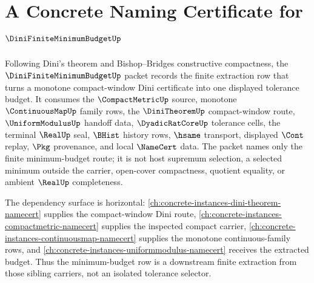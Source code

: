 \chapter{A Concrete Naming Certificate for $\DiniFiniteMinimumBudgetUp$}
\label{ch:concrete-instances-dini-finite-minimum-budget-namecert}

Following Dini's theorem and Bishop--Bridges constructive compactness, the $\DiniFiniteMinimumBudgetUp$ packet records the finite extraction row that turns a monotone compact-window Dini certificate into one displayed tolerance budget. It consumes the $\CompactMetricUp$ source, monotone $\ContinuousMapUp$ family rows, the $\DiniTheoremUp$ compact-window route, $\UniformModulusUp$ handoff data, $\DyadicRatCoreUp$ tolerance cells, the terminal $\RealUp$ seal, $\BHist$ history rows, $\hsame$ transport, displayed $\Cont$ replay, $\Pkg$ provenance, and local $\NameCert$ data. The packet names only the finite minimum-budget route; it is not host supremum selection, a selected minimum outside the carrier, open-cover compactness, quotient equality, or ambient $\RealUp$ completeness.

The dependency surface is horizontal: \autoref{ch:concrete-instances-dini-theorem-namecert} supplies the compact-window Dini route, \autoref{ch:concrete-instances-compactmetric-namecert} supplies the inspected compact carrier, \autoref{ch:concrete-instances-continuousmap-namecert} supplies the monotone continuous-family rows, and \autoref{ch:concrete-instances-uniformmodulus-namecert} receives the extracted budget. Thus the minimum-budget row is a downstream finite extraction from those sibling carriers, not an isolated tolerance selector.

